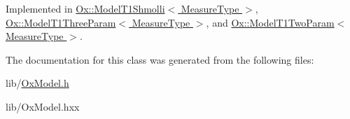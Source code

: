 Implemented in \hyperlink{class_ox_1_1_model_t1_shmolli_a846fb817183738d5c2b3f9f126c1597b}{Ox\-::\-Model\-T1\-Shmolli$<$ Measure\-Type $>$}, \hyperlink{class_ox_1_1_model_t1_three_param_afc6ffe41934c513e12a45cc5821fddca}{Ox\-::\-Model\-T1\-Three\-Param$<$ Measure\-Type $>$}, and \hyperlink{class_ox_1_1_model_t1_two_param_aa090c6834141f00a966eebd6b0415e44}{Ox\-::\-Model\-T1\-Two\-Param$<$ Measure\-Type $>$}.



The documentation for this class was generated from the following files\-:\begin{DoxyCompactItemize}
\item 
lib/\hyperlink{_ox_model_8h}{Ox\-Model.\-h}\item 
lib/Ox\-Model.\-hxx\end{DoxyCompactItemize}
